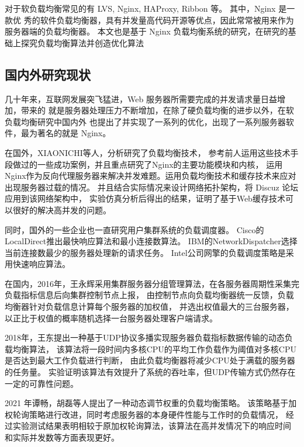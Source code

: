 对于软负载均衡常见的有 LVS\cite{lijp}, Nginx\cite{Zepeng}, HAProxy\cite{li2019dynamic}, Ribbon 等。
其中，Nginx 是一款优 秀的软件负载均衡器，具有并发量高代码开源等优点，因此常常被用来作为服务器端的负载均衡器。
本文也是基于 Nginx 负载均衡系统的研究，在研究的基础上探究负载均衡算法并创造优化算法

\subsection{国内外研究现状}

几十年来，互联网发展突飞猛进，Web 服务器所需要完成的并发请求量日益增加，带来的
就是服务器处理压力不断增加，在除了硬负载均衡的进步以外，在软负载均衡研究中国内外
也提出了并实现了一系列的优化，出现了一系列服务器软件，最为著名的就是 Nginx。

在国外，XIAONICHI等人\cite{chi2012web}，分析研究了负载均衡技术，
参考前人运用这些技术手段做过的一些成功案例，并且重点研究了Nginx的主要功能模块和内核，
运用Nginx作为反向代理服务器来解决并发难题。运用负载均衡技术和缓存技术来应对出现服务器过载的情况。
并且结合实际情况来设计网络拓扑架构，将 Discuz 论坛应用到该网络架构中，
实验仿真分析后得出的结果，证明了基于Web缓存技术可以很好的解决高并发的问题。

同时，国外的一些企业也一直研究用户集群系统的负载调度器。
Cisco的LocalDirect推出最快响应算法和最小连接数算法。
IBM的NetworkDispatcher选择当前连接数最少的服务器处理新的请求任务。
Intel公司网擎的负载调度策略是采用快速响应算法\cite{张淇2020服务器集群负载均衡算法在商务系统中的研究与应用}。

在国内，2016年，王永辉采用集群服务器分组管理算法，在各服务器周期性采集完负载指标信息后向集群控制节点上报，
由控制节点向负载均衡器统一反馈，负载均衡器针对负载信息计算每个服务器的加权值，
并选出权值最大的三台服务器，以正比于权值的概率随机选择一台服务器处理客户端请求\cite{王永辉2015基于}。

2018年，王东提出一种基于UDP协议多播实现服务器负载指标数据传输的动态负载均衡算法，
该算法将一段时间内多核CPU的平均工作负载作为阈值对多核CPU是否达到最大工作负载进行判断，
由此负载均衡器将减少CPU处于满载的服务器的任务量\cite{王东2018动态反馈负载均衡策略的研究}。
实验证明该算法有效提升了系统的吞吐率，但UDP传输方式仍然存在一定的可靠性问题。

2021 年谭畅，胡磊等人\cite{谭畅2021云中心基于}提出了一种动态调节权重的负载均衡策略。
该策略基于加权轮询策略进行改进，同时考虑服务器的本身硬件性能与工作时的负载情况，
经过实验测试结果表明相较于原加权轮询算法，该算法在高并发情况下的响应时间
和实际并发数等方面表现更好。

